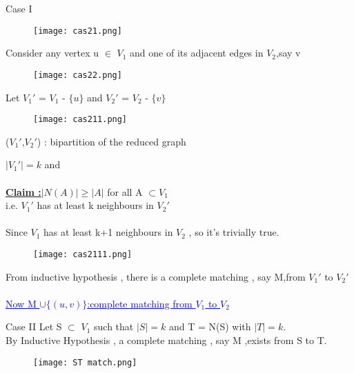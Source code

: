 \documentclass[12pt]{beamer}
\begin{document}
\begin{frame}{Case I}
\begin{figure}[h]
\texttt{[image: cas21.png]}
\end{figure}
Consider any vertex u $\in$ $V_1$ and one of its adjacent edges in $V_2$,say v 
\begin{figure}[h]
\texttt{[image: cas22.png]}
\end{figure}
\end{frame}

\begin{frame}
Let $V_1'$ = $V_1$ - $\{u\}$ and $V_2'$ = $V_2$ - $\{v\}$
\begin{figure}
\texttt{[image: cas211.png]}
\end{figure}

($V_1'$,$V_2'$) : bipartition of the reduced graph 
\end{frame}

\begin{frame}
$|V_1'|=k$ and \\~\\
\underline{\textbf{Claim :}}$|N(A)| \geq |A|$ for all A $\subset V_1$ \\
i.e. $V_1'$ has at least k neighbours in $V_2'$\\~\\
Since $V_1$ has at least k+1 neighbours in $V_2$ , so it's trivially true.
\begin{figure}
\texttt{[image: cas2111.png]}
\end{figure}

From inductive hypothesis , there is a complete matching , say M,from $V_1'$ to $V_2'$ \\~\\ 
\textcolor{blue}{\underline{Now M $\cup \{(u,v)\}$:complete matching from $V_1$ to $V_2$}}
\end{frame}

\begin{frame}{Case II}
Let S $\subset$ $V_1$ such that $|S| = k$ and T = N(S) with $|T| = k$.\\

By Inductive Hypothesis , a complete matching , say M ,exists from S to T.\\
\begin{figure}
\texttt{[image: ST match.png]}
\end{figure}
\end{frame}
\end{document}
